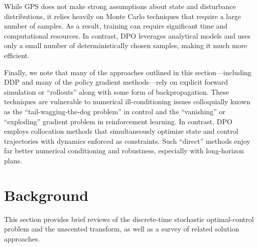 While GPS does not make strong assumptions about state and disturbance distributions, it relies heavily on Monte Carlo techniques that require a large number of samples. As a result, training can require significant time and computational resources. In contrast, DPO leverages analytical models and uses only a small number of deterministically chosen samples, making it much more efficient.

Finally, we note that many of the approaches outlined in this section---including DDP and many of the policy gradient methods---rely on explicit forward simulation or ``rollouts'' along with some form of backpropagation. These techniques are vulnerable to numerical ill-conditioning issues colloquially known as the ``tail-wagging-the-dog problem'' in control and the ``vanishing'' or ``exploding'' gradient problem in reinforcement learning. In contrast, DPO employs collocation methods that simultaneously optimize state and control trajectories with dynamics enforced as constraints. Such ``direct'' methods enjoy far better numerical conditioning and robustness, especially with long-horizon plans.

\section{Background}\label{dpo_background}
This section provides brief reviews of the discrete-time stochastic optimal-control problem and the unscented transform, as well as a survey of related solution approaches.

